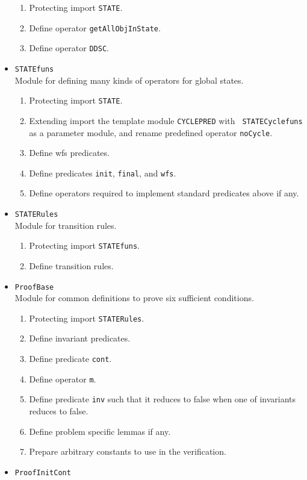 \documentclass[12pt]{report}
\begin{document}
\begin{itemize}
\begin{enumerate}
  \item Protecting import {\tt STATE}.
  \item Define operator {\tt getAllObjInState}.
  \item Define operator {\tt DDSC}.
  \end{enumerate}
\item {\tt STATEfuns}\\
  Module for defining many kinds of operators for global states.
  \begin{enumerate}
  \item Protecting import {\tt STATE}.
  \item Extending import the template module {\tt CYCLEPRED} with {\tt
    STATECyclefuns} as a parameter module, and rename predefined
    operator {\tt noCycle}.
  \item Define wfs predicates.
  \item Define predicates {\tt init}, {\tt final}, and {\tt wfs}.
  \item Define operators required to implement standard predicates
    above if any.
  \end{enumerate}
\item {\tt STATERules}\\
  Module for transition rules.
  \begin{enumerate}
  \item Protecting import {\tt STATEfuns}.
  \item Define transition rules.
  \end{enumerate}
\item {\tt ProofBase}\\
  Module for common definitions to prove six sufficient conditions.
  \begin{enumerate}
  \item Protecting import {\tt STATERules}.
  \item Define invariant predicates.
  \item Define predicate {\tt cont}.
  \item Define operator {\tt m}.
  \item Define predicate {\tt inv} such that it reduces to false when
    one of invariants reduces to false.
  \item Define problem specific lemmas if any.
  \item Prepare arbitrary constants to use in the verification.
  \end{enumerate}
\item {\tt ProofInitCont}\\

\end{itemize}
\end{document}
